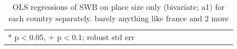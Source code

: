 \documentclass[10pt, letterpaper]{article}
\begin{document}
\begin{spacing}{1.4}
\begin{spacing}{.9} \begin{table}[H]\centering   \begin{scriptsize} \begin{tabular}{p{.5in}p{.5in}p{.5in}p{.5in}p{.5in}p{.5in}p{.5in}p{.5in}p{.5in}p{.5in}p{.5
                                                                      in}p{.5in}p{.5
                                                                      in}}\hline
                                                                      
                                                                      \hline *
                                                                      p$<$0.05,
                                                                      $+$
                                                                      p$<$0.1;
                                                                      robust std
                                                                      err \end{tabular}\end{scriptsize}\caption{\label{d1}OLS
                                                                    regressions
                                                                    of SWB on
                                                                    place size
                                                                    only
                                                                    (bivariate; a1)
                                                                    for each
                                                                    country
                                                                    separately. barely
                                                                    anything
                                                                    like france
                                                                    and 2 more
                                                                  }\end{table} \end{spacing}

 



\end{spacing}
\end{document}
